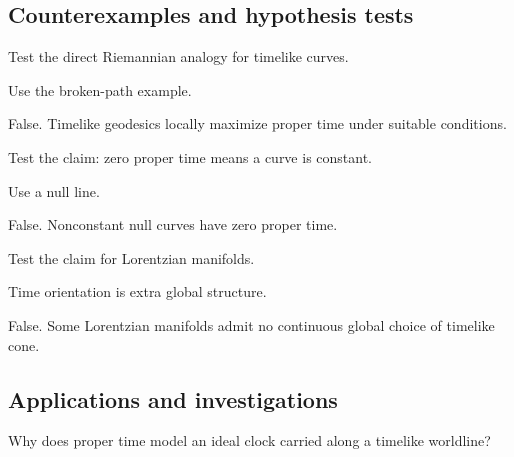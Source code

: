 \subsection*{Counterexamples and hypothesis tests}

\begin{exercise}\label{exr:vii30-ped-10}
Test the direct Riemannian analogy for timelike curves.
\end{exercise}

\begin{hint}
Use the broken-path example.
\end{hint}

\begin{solution}
False.  Timelike geodesics locally maximize proper time under suitable conditions.
\end{solution}

\begin{exercise}\label{exr:vii30-ped-11}
Test the claim: zero proper time means a curve is constant.
\end{exercise}

\begin{hint}
Use a null line.
\end{hint}

\begin{solution}
False.  Nonconstant null curves have zero proper time.
\end{solution}

\begin{exercise}\label{exr:vii30-ped-12}
Test the claim for Lorentzian manifolds.
\end{exercise}

\begin{hint}
Time orientation is extra global structure.
\end{hint}

\begin{solution}
False.  Some Lorentzian manifolds admit no continuous global choice of timelike cone.
\end{solution}

\subsection*{Applications and investigations}

\begin{exercise}\label{exr:vii30-ped-13}
Why does proper time model an ideal clock carried along a timelike worldline?
\end{exercise}

